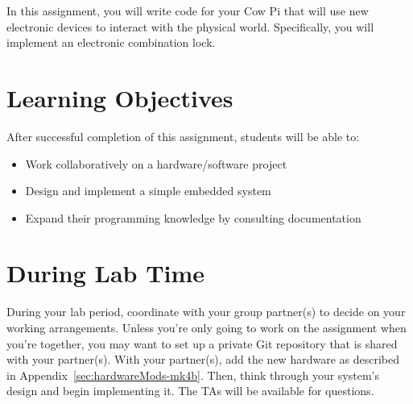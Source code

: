 In this assignment, you will write code for your Cow Pi that will use new electronic devices to interact with the physical world.
Specifically, you will implement an electronic combination lock.


\tableofcontents

\section*{Learning Objectives}

After successful completion of this assignment, students will be able to:
\begin{itemize}
    \item Work collaboratively on a hardware/software project
    \item Design and implement a simple embedded system
    \item Expand their programming knowledge by consulting documentation
\end{itemize}

\section*{During Lab Time}

During your lab period, coordinate with your group partner(s) to decide on your working arrangements.
Unless you're only going to work on the assignment when you're together, you may want to set up a private Git repository that is shared with your partner(s).
With your partner(s), add the new hardware as described in Appendix~\ref{sec:hardwareMods-mk4b}.
Then, think through your system's design and begin implementing it.
The TAs will be available for questions.
